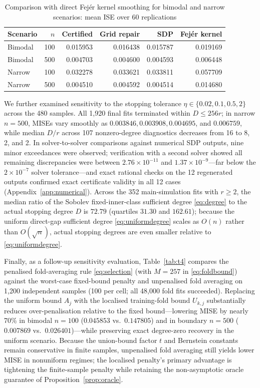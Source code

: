\begin{table}[htbp]
\centering
\caption{Comparison with direct Fejér kernel smoothing for bimodal and narrow scenarios: mean ISE over 60 replications}\label{tab:t3}
\small
\begin{tabular}{lrrrrr}
\toprule
Scenario & \(n\) & Certified & Grid repair & SDP & Fejér kernel \\
\midrule
Bimodal & 100 & 0.015953 & 0.016438 & 0.015787 & 0.019169 \\
Bimodal & 500 & 0.004703 & 0.004600 & 0.004593 & 0.006448 \\
Narrow & 100 & 0.032278 & 0.033621 & 0.033811 & 0.057709 \\
Narrow & 500 & 0.004510 & 0.004592 & 0.004514 & 0.014680 \\
\bottomrule
\end{tabular}
\end{table}

We further examined sensitivity to the stopping tolerance \(\eta\in\{0.02,0.1,0.5,2\}\) across the 480 samples. All 1,920 final fits terminated within \(D\le256r\); in narrow \(n=500\), MISEs vary smoothly as \(0.003846, 0.003908, 0.004695\), and \(0.006759\), while median \(D/r\) across 107 nonzero-degree diagnostics decreases from 16 to 8, 2, and 2. In solver-to-solver comparisons against numerical SDP outputs, nine minor exceedances were observed; verification with a second solver showed all remaining discrepancies were between \(2.76\times10^{-11}\) and \(1.37\times10^{-9}\)---far below the \(2\times10^{-7}\) solver tolerance---and exact rational checks on the 12 regenerated outputs confirmed exact certificate validity in all 12 cases (Appendix~\ref{app:numerical}). Across the 352 main-simulation fits with \(r\ge2\), the median ratio of the Sobolev fixed-inner-class sufficient degree \eqref{eq:degree} to the actual stopping degree \(D\) is \(72.79\) (quartiles \(31.30\) and \(162.61\)); because the uniform direct-gap sufficient degree \eqref{eq:uniformdegree} scales as \(O(n)\) rather than \(O(\sqrt{n})\), actual stopping degrees are even smaller relative to \eqref{eq:uniformdegree}.

Finally, as a follow-up sensitivity evaluation, Table~\ref{tab:t4} compares the penalised fold-averaging rule \eqref{eq:selection} (with \(M=257\) in \eqref{eq:foldbound}) against the worst-case fixed-bound penalty and unpenalised fold averaging on 1,200 independent samples (100 per cell; all 48,000 fold fits succeeded). Replacing the uniform bound \(A_j\) with the localised training-fold bound \(U_{k,j}\) substantially reduces over-penalisation relative to the fixed bound---lowering MISE by nearly 70\% in bimodal \(n=100\) (\(0.045853\) vs.\ \(0.147805\)) and in boundary \(n=500\) (\(0.007869\) vs.\ \(0.026401\))---while preserving exact degree-zero recovery in the uniform scenario. Because the union-bound factor \(t\) and Bernstein constants remain conservative in finite samples, unpenalised fold averaging still yields lower MISE in nonuniform regimes; the localised penalty's primary advantage is tightening the finite-sample penalty while retaining the non-asymptotic oracle guarantee of Proposition~\ref{prop:oracle}.

